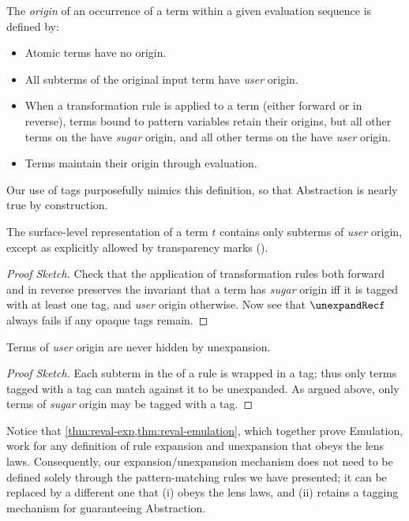 \begin{definition}
\label{def:reval-origin}
The \emph{origin} of an occurrence of a term within a given evaluation
sequence is defined by:
\begin{itemize}
\item Atomic terms have no origin.
\item All subterms of the original input term have \emph{user} origin.
\item When a transformation rule is applied to a term (either forward or
  in reverse), terms bound to pattern variables retain their origins, but
  all other terms on the {\RHS} have \emph{sugar} origin, and
  all other terms on the {\LHS} have \emph{user} origin.
\item Terms maintain their origin through evaluation.
\end{itemize}
\end{definition}

Our use of {\MacBodyf} tags purposefully mimics this definition, so that
Abstraction is nearly true by construction.

\begin{thm}[Abstraction 1]
\label{thm:reval-abstraction}
The surface-level representation of a term $t$ contains only subterms of
\emph{user} origin, except as explicitly allowed by transparency marks
(\Code{!}).
\end{thm}
\begin{proof}[Proof Sketch]
Check that the application of transformation rules both forward and in
reverse preserves the invariant that a term has \emph{sugar} origin iff it
is tagged with at least one {\MacBodyf} tag, and \emph{user} origin
otherwise. Now see that $\unexpandRecf$ always fails if any opaque
{\MacBodyf} tags remain.
\end{proof}
\begin{thm}[Abstraction 2]
Terms of \emph{user} origin are never hidden by unexpansion.
\end{thm}
\begin{proof}[Proof Sketch]
Each subterm in the {\RHS} of a rule is wrapped in a {\MacBodyf} tag; thus
only terms tagged with a {\MacBodyf} tag can match against it to be
unexpanded. As argued above, only terms of \emph{sugar} origin may be
tagged with a {\MacBodyf} tag.
\end{proof}

Notice that \cref{thm:reval-exp,thm:reval-emulation}, which together prove
Emulation, work for any definition of rule expansion and unexpansion that
obeys the lens laws. Consequently, our expansion/unexpansion mechanism
does not need to be defined solely through the pattern-matching rules
we have presented; it can be replaced by a different one that
(i) obeys the lens
laws, and (ii) retains a tagging mechanism for guaranteeing Abstraction.




